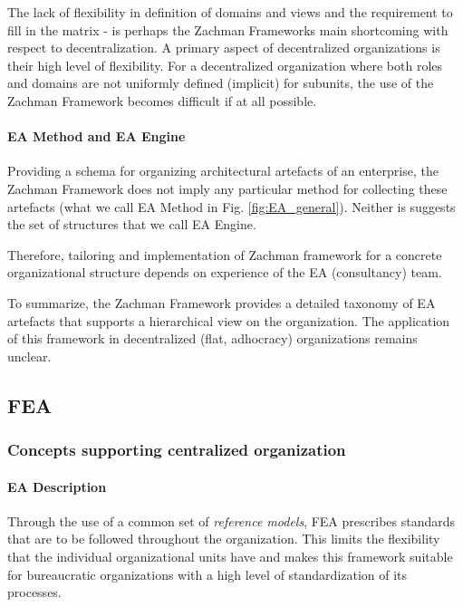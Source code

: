 The lack of flexibility in definition of domains and views and the requirement to fill in the matrix - is perhaps the Zachman Frameworks main shortcoming with respect to decentralization. A primary aspect of decentralized organizations is their high level of flexibility. For a decentralized organization where both roles and domains are not uniformly defined (implicit) for subunits, the use of the Zachman Framework becomes difficult if at all possible.


\paragraph*{EA Method and EA Engine}

Providing a schema for organizing architectural artefacts of an enterprise, the Zachman Framework does not imply any particular method for collecting these artefacts (what we call EA Method in Fig. \ref{fig:EA_general}).
Neither is suggests the set of structures that we call EA Engine. 

Therefore, tailoring and  implementation of Zachman framework for a concrete organizational structure depends on experience of the EA (consultancy) team.

To summarize, the Zachman Framework provides a detailed taxonomy of EA artefacts that supports a hierarchical view on the organization. The application of this framework in decentralized (flat, adhocracy) organizations remains unclear.

\subsection{FEA}
\subsubsection{Concepts supporting centralized organization}
\paragraph*{EA Description}
Through the use of a common set of \textit{reference models}, FEA prescribes standards that are to be followed throughout the organization. This limits the flexibility that the individual organizational units have and makes this framework suitable for bureaucratic organizations with a high level of standardization of its processes.


